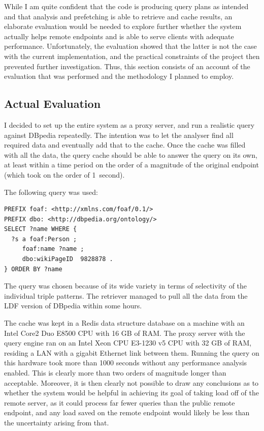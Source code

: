 While I am quite confident that the code is producing query plans as
intended and that analysis and prefetching is able to retrieve and
cache results, an elaborate evaluation would be needed to explore
further whether the system actually helps remote endpoints and is able
to serve clients with adequate performance. Unfortunately, the
evaluation showed that the latter is not the case with the current
implementation, and the practical constraints of the project then
prevented further investigation. Thus, this section consists of an
account of the evaluation that was performed and the methodology I
planned to employ.

\subsection{Actual Evaluation}

I decided to set up the entire system as a proxy server, and run a
realistic query against DBpedia repeatedly. The intention was to let
the analyser find all required data and eventually add that to the
cache. Once the cache was filled with all the data, the query cache
should be able to answer the query on its own, at least within a time
period on the order of a magnitude of the original endpoint (which
took on the order of 1~second). 

The following query was used:

\begin{verbatim}
PREFIX foaf: <http://xmlns.com/foaf/0.1/>
PREFIX dbo: <http://dbpedia.org/ontology/>
SELECT ?name WHERE {
  ?s a foaf:Person ;
     foaf:name ?name ;
     dbo:wikiPageID  9828878 .
} ORDER BY ?name
\end{verbatim}

The query was chosen because of its wide variety in terms of
selectivity of the individual triple patterns. The retriever managed
to pull all the data from the LDF version of DBpedia
within some hours. 

The cache was kept in a Redis data structure database on a machine
with an Intel Core2 Duo E8500 CPU with 16 GB of RAM. The proxy server
with the query engine ran on an Intel Xeon CPU E3-1230 v5 CPU with 32
GB of RAM, residing a LAN with a gigabit Ethernet link between
them. Running the query on this hardware took more than 1000 seconds
without any performance analysis enabled. This is clearly more than
two orders of magnitude longer than acceptable. Moreover, it is then
clearly not possible to draw any conclusions as to whether the system
would be helpful in achieving its goal of taking load off of the
remote server, as it could process far fewer queries than the public
remote endpoint, and any load saved on the remote endpoint would
likely be less than the uncertainty arising from that.

